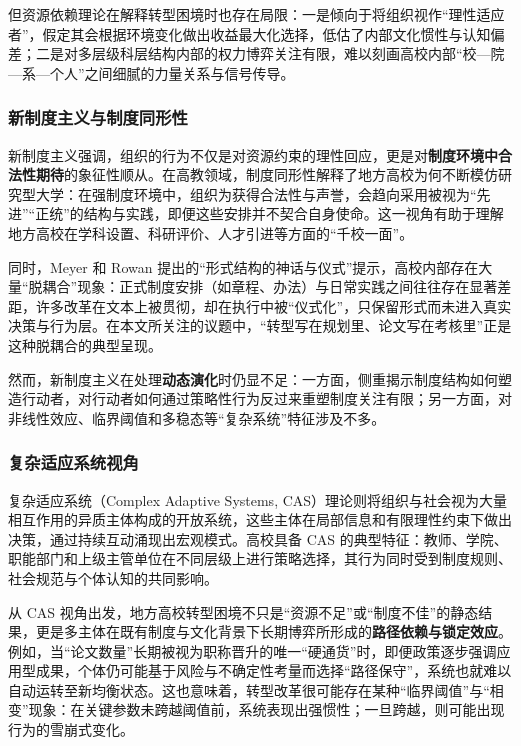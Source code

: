 \documentclass[UTF8, zihao=-4, fontset=mac]{ctexart}
\begin{document}
但资源依赖理论在解释转型困境时也存在局限：一是倾向于将组织视作“理性适应者”，假定其会根据环境变化做出收益最大化选择，低估了内部文化惯性与认知偏差；二是对多层级科层结构内部的权力博弈关注有限，难以刻画高校内部“校—院—系—个人”之间细腻的力量关系与信号传导。

\subsubsection{新制度主义与制度同形性}

新制度主义强调，组织的行为不仅是对资源约束的理性回应，更是对\textbf{制度环境中合法性期待}的象征性顺从\cite{dimaggio1983iron, meyer1977institutionalized}。在高教领域，制度同形性解释了地方高校为何不断模仿研究型大学：在强制度环境中，组织为获得合法性与声誉，会趋向采用被视为“先进”“正统”的结构与实践，即便这些安排并不契合自身使命。这一视角有助于理解地方高校在学科设置、科研评价、人才引进等方面的“千校一面”。

同时，Meyer 和 Rowan 提出的“形式结构的神话与仪式”提示，高校内部存在大量“脱耦合”现象：正式制度安排（如章程、办法）与日常实践之间往往存在显著差距，许多改革在文本上被贯彻，却在执行中被“仪式化”，只保留形式而未进入真实决策与行为层\cite{meyer1977institutionalized, weick1976educational}。在本文所关注的议题中，“转型写在规划里、论文写在考核里”正是这种脱耦合的典型呈现。

然而，新制度主义在处理\textbf{动态演化}时仍显不足：一方面，侧重揭示制度结构如何塑造行动者，对行动者如何通过策略性行为反过来重塑制度关注有限；另一方面，对非线性效应、临界阈值和多稳态等“复杂系统”特征涉及不多。

\subsubsection{复杂适应系统视角}

复杂适应系统（Complex Adaptive Systems, CAS）理论则将组织与社会视为大量相互作用的异质主体构成的开放系统，这些主体在局部信息和有限理性约束下做出决策，通过持续互动涌现出宏观模式\cite{holland1995hidden, miller2007complex}。高校具备 CAS 的典型特征：教师、学院、职能部门和上级主管单位在不同层级上进行策略选择，其行为同时受到制度规则、社会规范与个体认知的共同影响。

从 CAS 视角出发，地方高校转型困境不只是“资源不足”或“制度不佳”的静态结果，更是多主体在既有制度与文化背景下长期博弈所形成的\textbf{路径依赖与锁定效应}。例如，当“论文数量”长期被视为职称晋升的唯一“硬通货”时，即便政策逐步强调应用型成果，个体仍可能基于风险与不确定性考量而选择“路径保守”，系统也就难以自动运转至新均衡状态。这也意味着，转型改革很可能存在某种“临界阈值”与“相变”现象：在关键参数未跨越阈值前，系统表现出强惯性；一旦跨越，则可能出现行为的雪崩式变化\cite{scheffer2009early}。
\end{document}
